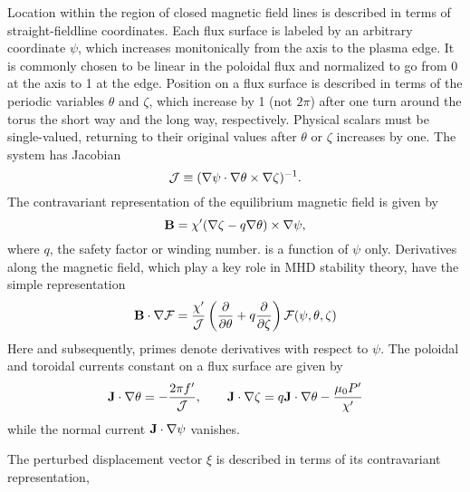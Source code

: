 \documentclass[prb,twocolumn,showpacs,preprintnumbers,amsmath,amssymb]{revtex4}
\renewcommand*{\v}[1]{\hbox{\bfseries #1}}
\newcommand{\vm}[1]{\mbox{\boldmath$#1$}}
\begin{document}
Location within the region of closed magnetic field lines is described
in terms of straight-fieldline coordinates.  Each flux surface is
labeled by an arbitrary coordinate $\psi$, which increases monitonically
from the axis to the plasma edge.  It is commonly chosen to be linear in
the poloidal flux and normalized to go from 0 at the axis to 1 at the
edge.  Position on a flux surface is described in terms of the periodic
variables $\theta$ and $\zeta$, which increase by 1 (not $2\pi$) after
one turn around the torus the short way and the long way, respectively.
Physical scalars must be single-valued, returning to their original
values after $\theta$ or $\zeta$ increases by one.  The system has
Jacobian
\[
{\cal J} \equiv (\nabla \psi \cdot \nabla \theta \times \nabla \zeta)^{-1}.
\]
The contravariant representation of the equilibrium magnetic field is
given by
\[
\v{B} = \chi' (\nabla \zeta - q \nabla \theta) \times \nabla \psi,
\]
where $q$, the safety factor or winding number. is a function of $\psi$
only.  Derivatives along the magnetic field, which play a key role in
MHD stability theory, have the simple representation
\[
\v{B} \cdot \nabla {\cal F} = \frac{\chi'}{\cal J}
	\left( \frac{\partial}{\partial \theta} 
	+ q \frac{\partial}{\partial \zeta} \right) 
	{\cal F}(\psi,\theta,\zeta)
\]
Here and subsequently, primes denote derivatives with respect to $\psi$.
The poloidal and toroidal currents constant on a flux surface are given
by
\[
\v{J} \cdot \nabla \theta = -\frac{2\pi f'}{\cal J}, \qquad 
\v{J} \cdot \nabla \zeta = q \v{J} \cdot \nabla \theta
	 - \frac{\mu_0 P'}{\chi'}
\]
while the normal current $\v{J} \cdot \nabla \psi$ vanishes.

The perturbed displacement vector \vm{\xi} is described in terms of its
contravariant representation,
\end{document}

